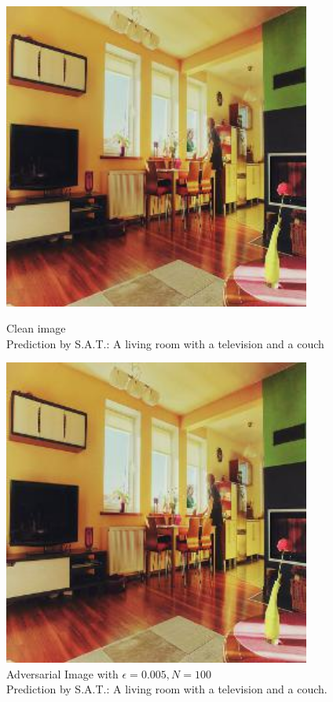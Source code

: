 \begin{figure}[ht]
    \centering
    \begin{minipage}{0.45\textwidth}
        \centering
        \includegraphics[width=0.9\textwidth]{figures/Distract/n=100/samples/0.000/img_0.jpg} %
        \caption*{Clean image\\Prediction by S.A.T.: A living room with a television and a couch}
    \end{minipage}\hfill
    \begin{minipage}{0.45\textwidth}
        \centering
        \includegraphics[width=0.9\textwidth]{figures/Distract/n=100/samples/0.005/img_0.jpg} %
        \caption*{Adversarial Image with $\epsilon=0.005, N=100$\\Prediction by S.A.T.: A living room with a television and a couch.}
    \end{minipage}
\end{figure}

